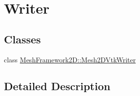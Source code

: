 \hypertarget{group__Writer}{}\section{Writer}
\label{group__Writer}
\subsection*{Classes}
\begin{DoxyCompactItemize}
\item 
class \hyperlink{classMeshFramework2D_1_1Mesh2DVtkWriter}{Mesh\+Framework2\+D\+::\+Mesh2\+D\+Vtk\+Writer}
\end{DoxyCompactItemize}


\subsection{Detailed Description}
